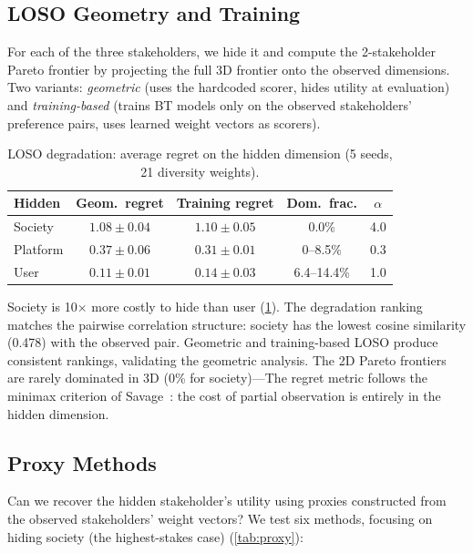 \documentclass[11pt,letterpaper]{article}
\begin{document}
\subsection{LOSO Geometry and Training}

For each of the three stakeholders, we hide it and compute the
2-stakeholder Pareto frontier by projecting the full 3D frontier onto
the observed dimensions. Two variants: \emph{geometric} (uses the
hardcoded scorer, hides utility at evaluation) and
\emph{training-based} (trains BT models only on the observed
stakeholders' preference pairs, uses learned weight vectors as
scorers).

\begin{table}[t]
  \caption{LOSO degradation: average regret on the hidden dimension
    (5 seeds, 21 diversity weights).}
  \label{tab:loso}
  \centering\small
  \begin{tabular}{lcccc}
    \toprule
    \textbf{Hidden} & \textbf{Geom.\ regret} & \textbf{Training regret} & \textbf{Dom.\ frac.} & \textbf{$\alpha$} \\
    \midrule
    Society  & $\mathbf{1.08 \pm 0.04}$ & $1.10 \pm 0.05$ & 0.0\% & 4.0 \\
    Platform & $0.37 \pm 0.06$ & $0.31 \pm 0.01$ & 0--8.5\% & 0.3 \\
    User     & $0.11 \pm 0.01$ & $0.14 \pm 0.03$ & 6.4--14.4\% & 1.0 \\
    \bottomrule
  \end{tabular}
\end{table}

Society is 10$\times$ more costly to hide than user (\cref{tab:loso}).
The degradation ranking matches the pairwise correlation structure:
society has the lowest cosine similarity (0.478) with the observed
pair. Geometric and training-based LOSO produce consistent
rankings, validating the geometric analysis. The 2D Pareto frontiers
are rarely dominated in 3D (0\% for society)---The regret metric follows the minimax criterion of Savage~\cite{savage1951theory}: the cost of partial
observation is entirely in the hidden dimension.

\subsection{Proxy Methods}

Can we recover the hidden stakeholder's utility using proxies
constructed from the observed stakeholders' weight vectors? We test
six methods, focusing on hiding society (the highest-stakes case) (\cref{tab:proxy}):
\end{document}
